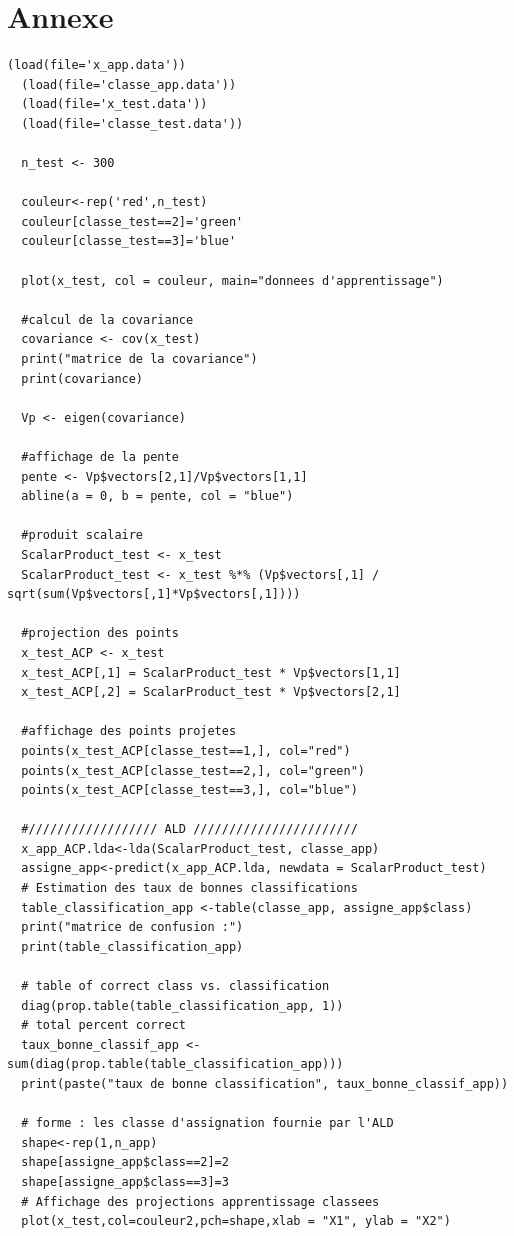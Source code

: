 \documentclass[a4paper,11pt]{article}
\begin{document}
  \newpage
  \section{Annexe}
  \begin{lstlisting}[caption=Macro de l'analyse en composante principale]
  (load(file='x_app.data'))
  (load(file='classe_app.data'))
  (load(file='x_test.data'))
  (load(file='classe_test.data'))

  n_test <- 300

  couleur<-rep('red',n_test)
  couleur[classe_test==2]='green'
  couleur[classe_test==3]='blue'

  plot(x_test, col = couleur, main="donnees d'apprentissage")

  #calcul de la covariance
  covariance <- cov(x_test)
  print("matrice de la covariance")
  print(covariance)

  Vp <- eigen(covariance)

  #affichage de la pente
  pente <- Vp$vectors[2,1]/Vp$vectors[1,1]
  abline(a = 0, b = pente, col = "blue")

  #produit scalaire
  ScalarProduct_test <- x_test
  ScalarProduct_test <- x_test %*% (Vp$vectors[,1] / sqrt(sum(Vp$vectors[,1]*Vp$vectors[,1])))

  #projection des points
  x_test_ACP <- x_test
  x_test_ACP[,1] = ScalarProduct_test * Vp$vectors[1,1]
  x_test_ACP[,2] = ScalarProduct_test * Vp$vectors[2,1]

  #affichage des points projetes
  points(x_test_ACP[classe_test==1,], col="red")
  points(x_test_ACP[classe_test==2,], col="green")
  points(x_test_ACP[classe_test==3,], col="blue")

  #////////////////// ALD ///////////////////////
  x_app_ACP.lda<-lda(ScalarProduct_test, classe_app)
  assigne_app<-predict(x_app_ACP.lda, newdata = ScalarProduct_test)
  # Estimation des taux de bonnes classifications
  table_classification_app <-table(classe_app, assigne_app$class)
  print("matrice de confusion :")
  print(table_classification_app)

  # table of correct class vs. classification
  diag(prop.table(table_classification_app, 1))
  # total percent correct
  taux_bonne_classif_app <-sum(diag(prop.table(table_classification_app)))
  print(paste("taux de bonne classification", taux_bonne_classif_app))

  # forme : les classe d'assignation fournie par l'ALD
  shape<-rep(1,n_app)
  shape[assigne_app$class==2]=2
  shape[assigne_app$class==3]=3
  # Affichage des projections apprentissage classees
  plot(x_test,col=couleur2,pch=shape,xlab = "X1", ylab = "X2")

  \end{lstlisting}
  
\end{document}
